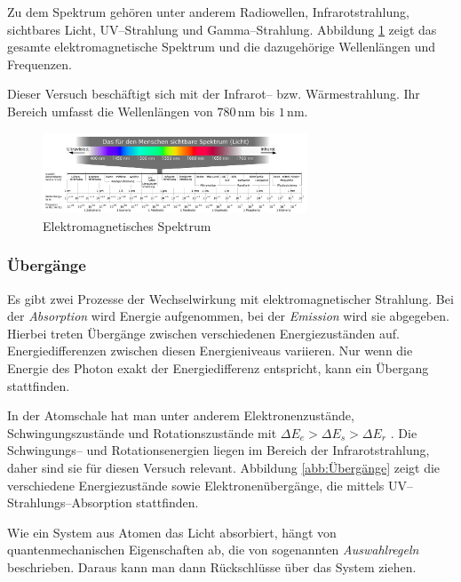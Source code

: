 \documentclass[12pt,a4paper]{scrartcl}
\numberwithin{equation}{section} %
\begin{document}
Zu dem Spektrum gehören unter anderem Radiowellen, Infrarotstrahlung, sichtbares Licht, UV--Strahlung und Gamma--Strahlung. Abbildung \ref{abb:EM Spektrum} zeigt das gesamte elektromagnetische Spektrum und die dazugehörige Wellenlängen und Frequenzen.

Dieser Versuch beschäftigt sich mit der Infrarot-- bzw. Wärmestrahlung. Ihr Bereich umfasst die Wellenlängen von $780\mathrm{\,nm}$ bis $1\mathrm{\,nm}$.

\begin{figure}[h!]
	\centering
	\includegraphics[width=0.7\textwidth]{../media/B1.1/EM_Spektrum.png}
	\caption{Elektromagnetisches Spektrum \cite{Wikipedia: Elektromagnetisches Spektrum}}
	\label{abb:EM Spektrum}
\end{figure}

\subsubsection{Übergänge}
\label{Übergänge}
Es gibt zwei Prozesse der Wechselwirkung mit elektromagnetischer Strahlung. Bei der \emph{Absorption} wird Energie aufgenommen, bei der \emph{Emission} wird sie abgegeben. Hierbei treten Übergänge zwischen verschiedenen Energiezuständen auf. Energiedifferenzen zwischen diesen Energieniveaus variieren. Nur wenn die Energie des Photon exakt der Energiedifferenz entspricht, kann ein Übergang stattfinden.

In der Atomschale hat man unter anderem Elektronenzustände, Schwingungszustände und Rotationszustände mit $\Delta E_{e} > \Delta E_{s} > \Delta E_{r}$ \cite{Agilent Technologies}. Die Schwingungs-- und Rotationsenergien liegen im Bereich der Infrarotstrahlung, daher sind sie für diesen Versuch relevant. Abbildung \ref{abb:Übergänge} zeigt die verschiedene Energiezustände sowie Elektronenübergänge, die mittels UV--Strahlungs--Absorption stattfinden.

Wie ein System aus Atomen das Licht absorbiert, hängt von quantenmechanischen Eigenschaften ab, die von sogenannten \emph{Auswahlregeln} beschrieben. Daraus kann man dann Rückschlüsse über das System ziehen.
\end{document}
